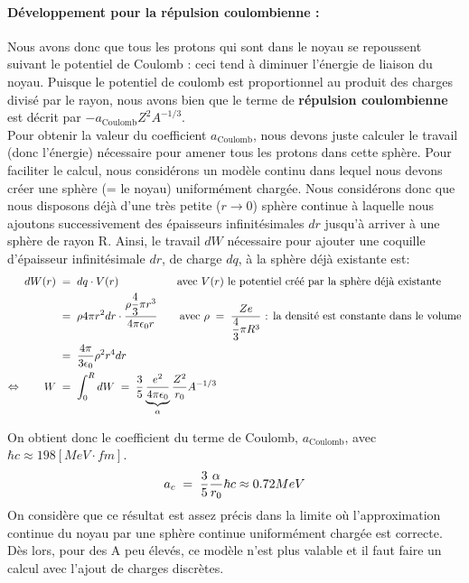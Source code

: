 \paragraph{Développement pour la répulsion coulombienne :}


Nous avons donc que tous les protons qui sont dans le noyau se repoussent suivant le potentiel de Coulomb : ceci tend à diminuer l'énergie de liaison du noyau. Puisque le potentiel de coulomb est proportionnel au produit des charges divisé par le rayon, nous avons bien que le terme de \textbf{répulsion coulombienne} est décrit par $-a_{\text{Coulomb}} Z^2 A^{-1/3}$.\\

Pour obtenir la valeur du coefficient $a_{\text{Coulomb}}$, nous devons juste calculer le travail (donc l'énergie) nécessaire pour amener tous les protons dans cette sphère. Pour faciliter le calcul, nous considérons un modèle continu dans lequel nous devons créer une sphère (= le noyau) uniformément chargée. Nous considérons donc que nous disposons déjà d'une très petite ($r \rightarrow 0$) sphère continue à laquelle nous ajoutons successivement des épaisseurs infinitésimales $dr$ jusqu'à arriver à une sphère de rayon R. Ainsi, le travail $dW$ nécessaire pour ajouter une coquille d'épaisseur infinitésimale $dr$, de charge $dq$, à la sphère déjà existante est:
\begin{align*}
    dW(r) &\; = \; 
    dq \cdot V(r) \qquad \qquad \quad \;\text{avec $V(r)$ le potentiel créé par la sphère déjà existante}
    \\ 
    &\; = \; 
    \rho 4\pi r^2 dr \cdot \dfrac{ \rho \dfrac{4}{3}\pi r^3}{4\pi\epsilon_0 r}
    \qquad \text{avec } \rho \; = \; \dfrac{Ze}{\dfrac{4}{3}\pi R^3}\text{ : la densité est constante dans le volume}\\
    &\; = \;
    \dfrac{4\pi}{3\epsilon_0}\rho^2 r^4 dr \\
    \Leftrightarrow \qquad W &\; = \;
    \int_0^R dW \; = \; \dfrac{3}{5}\underbrace{\dfrac{e^2}{4\pi\epsilon_0}}_{\alpha}\dfrac{Z^2}{r_0}A^{-1/3}
\end{align*}

On obtient donc le coefficient du terme de Coulomb, $a_{\text{Coulomb}}$, avec $\hbar c \approx 198 [MeV\cdot fm]$.
\begin{equation*}
    a_c \; = \; \dfrac{3}{5}\dfrac{\alpha}{r_0} \hbar c \approx 0.72MeV
\end{equation*}
On considère que ce résultat est assez précis dans la limite où l'approximation continue du noyau par une sphère continue uniformément chargée est correcte. Dès lors, pour des A peu élevés, ce modèle n'est plus valable et il faut faire un calcul avec l'ajout de charges discrètes.


